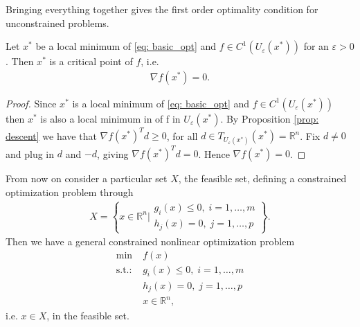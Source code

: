 Bringing everything together gives the first order optimality condition for
unconstrained problems.
\begin{theorem}
    Let $x^{*}$ be a local minimum of \ref{eq: basic_opt} and $f \in C^{1}
    (U_\varepsilon(x^{*} ))$ for an $\varepsilon >0$. Then $x^{*}$ is a
    critical point of $f$, i.e.
    \begin{align}
        \nabla f(x^{*}) = 0.
    \end{align}
\end{theorem}
\begin{proof}
    Since $x^{*}$ is a local minimum of \ref{eq: basic_opt} and $f \in C^{1}
    (U_\varepsilon(x^{*} ))$ then $x^{*} $ is also a local minimum in of f in
    $U_\varepsilon(x^{*})$. By Proposition \ref{prop: descent} we have that
    $\nabla f(x^{*} )^{T}  d \ge 0$, for all $d \in T_{U_\varepsilon(x^{*})
    }(x^{*} ) = \mathbb{R} ^{n}$. Fix $d \neq 0$ and plug in $d$ and $-d$,
    giving $\nabla f(x^{*})^{T} d = 0$. Hence $\nabla f(x^{*} ) = 0$.
\end{proof}
From now on consider a particular set $X$, the feasible set, defining a
constrained optimization problem through
\begin{align}
    X = \left\{ x \in \mathbb{R}^{n}\Big|
        \begin{array}{l}
            g_i(x) \le 0,\; i=1,\ldots,m\\
            h_j(x) = 0,\; j=1,\ldots,p
    \end{array} \right\}.
\end{align}
Then we have a general constrained nonlinear optimization problem
\begin{align}
    \min\;&f(x) \label{eq: gen_constraned}\\
    \text{s.t.:}\;&g_i(x) \le 0,\; i=1,\ldots,m \nonumber\\
        &h_j(x) = 0,\; j=1,\ldots,p \nonumber\\
        &x \in \mathbb{R}^{n}\nonumber,
\end{align}
i.e. $x \in X$, in the feasible set.

